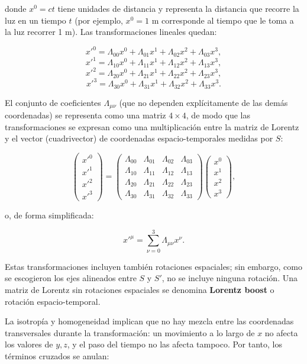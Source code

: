 donde $x^0 = ct$ tiene unidades de distancia y representa la distancia que recorre la luz en un tiempo $t$ (por ejemplo, $x^0 = 1$ m corresponde al tiempo que le toma a la luz recorrer 1 m). Las transformaciones lineales quedan:

$$x'^0 = \Lambda_{00}x^0 + \Lambda_{01}x^1 + \Lambda_{02}x^2 + \Lambda_{03}x^3,$$
$$x'^1 = \Lambda_{10}x^0 + \Lambda_{11}x^1 + \Lambda_{12}x^2 + \Lambda_{13}x^3,$$
$$x'^2 = \Lambda_{20}x^0 + \Lambda_{21}x^1 + \Lambda_{22}x^2 + \Lambda_{23}x^3,$$
$$x'^3 = \Lambda_{30}x^0 + \Lambda_{31}x^1 + \Lambda_{32}x^2 + \Lambda_{33}x^3.$$

El conjunto de coeficientes $\Lambda_{\mu\nu}$ (que no dependen explícitamente de las demás coordenadas) se representa como una matriz $4 \times 4$, de modo que las transformaciones se expresan como una multiplicación entre la matriz de Lorentz y el vector (cuadrivector) de coordenadas espacio-temporales medidas por $S$:

$$\left(\begin{array}{c} x'^0 \\ x'^1 \\ x'^2 \\ x'^3 \end{array}\right) = \left(\begin{array}{cccc} \Lambda_{00} & \Lambda_{01} & \Lambda_{02} & \Lambda_{03} \\ \Lambda_{10} & \Lambda_{11} & \Lambda_{12} & \Lambda_{13} \\ \Lambda_{20} & \Lambda_{21} & \Lambda_{22} & \Lambda_{23} \\ \Lambda_{30} & \Lambda_{31} & \Lambda_{32} & \Lambda_{33} \end{array}\right) \left(\begin{array}{c} x^0 \\ x^1 \\ x^2 \\ x^3 \end{array}\right),$$

o, de forma simplificada:

$$x'^{\mu} = \sum_{\nu=0}^{3} \Lambda_{\mu\nu} x^{\nu}.$$

Estas transformaciones incluyen también rotaciones espaciales; sin embargo, como se escogieron los ejes alineados entre $S$ y $S'$, no se incluye ninguna rotación. Una matriz de Lorentz sin rotaciones espaciales se denomina \textbf{Lorentz boost} o rotación espacio-temporal.

La isotropía y homogeneidad implican que no hay mezcla entre las coordenadas transversales durante la transformación: un movimiento a lo largo de $x$ no afecta los valores de $y, z$, y el paso del tiempo no las afecta tampoco. Por tanto, los términos cruzados se anulan:

